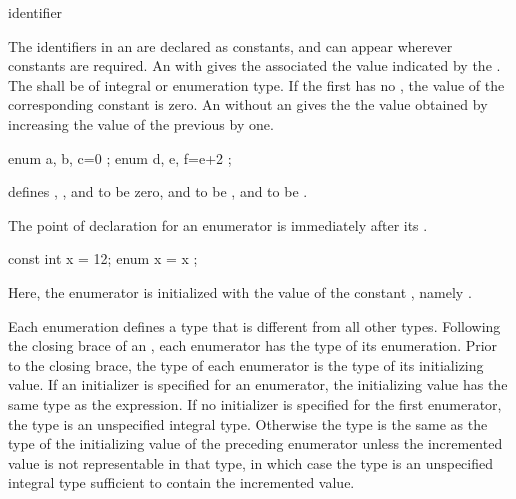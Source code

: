 \begin{bnf}
\br
    identifier
\end{bnf}

%
%
The identifiers in an  are declared as
constants, and can appear wherever constants are required.
%
An  with \tcode{=} gives the associated
 the value indicated by the
. The 
shall be of integral or enumeration type. If the first
 has no , the value of
the corresponding constant is zero. An 
without an  gives the 
the value obtained by increasing the value of the previous
 by one.

\pnum
\enterexample

\begin{codeblock}
enum { a, b, c=0 };
enum { d, e, f=e+2 };
\end{codeblock}

defines , , and  to be zero,  and
 to be , and  to be .
\exitexample

\pnum
The point of declaration for an enumerator is immediately after its
.
\enterexample

\begin{codeblock}
const int x = 12;
{ enum { x = x }; }
\end{codeblock}

Here, the enumerator  is initialized with the value of the
constant , namely .
\exitexample

\pnum
{}%
%
Each enumeration defines a type that is different from all other types.
Following the closing brace of an , each
enumerator has the type of its enumeration. Prior to the closing brace,
the type of each enumerator is the type of its initializing value. If an
initializer is specified for an enumerator, the initializing value has
the same type as the expression. If no initializer is specified for the
first enumerator, the type is an unspecified integral type. Otherwise
the type is the same as the type of the initializing value of the
preceding enumerator unless the incremented value is not representable
in that type, in which case the type is an unspecified integral type
sufficient to contain the incremented value.

